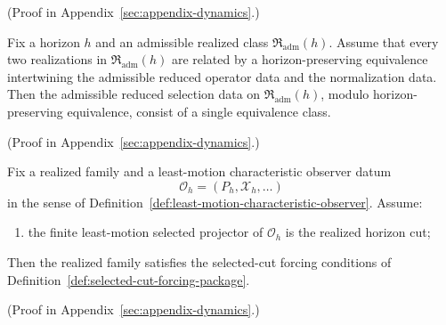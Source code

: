 (Proof in Appendix~\ref{sec:appendix-dynamics}.)

\begin{theorem}
\label{thm:classwise-horizon-equivalence-collapses-reduced-selection}
Fix a horizon \(h\) and an admissible realized class
\(\mathfrak R_{\mathrm{adm}}(h)\). Assume that every two realizations in
\(\mathfrak R_{\mathrm{adm}}(h)\) are related by a horizon-preserving
equivalence intertwining the admissible reduced operator data and the
normalization data. Then the admissible reduced selection data on
\(\mathfrak R_{\mathrm{adm}}(h)\), modulo horizon-preserving equivalence,
consist of a single equivalence class.
\end{theorem}

(Proof in Appendix~\ref{sec:appendix-dynamics}.)

\begin{theorem}
\label{thm:temporal-realization-forces-selected-cut-forcing-package}
Fix a realized family and a least-motion characteristic observer datum
\[
\mathcal O_h=(P_h,\mathcal X_h,\dots)
\]
in the sense of
Definition~\ref{def:least-motion-characteristic-observer}. Assume:
\begin{enumerate}[label=(\roman*), leftmargin=2em, itemsep=0.2em]
\item the finite least-motion selected projector of \(\mathcal O_h\) is the
      realized horizon cut;
\end{enumerate}
Then the realized family satisfies the selected-cut forcing conditions of
Definition~\ref{def:selected-cut-forcing-package}.
\end{theorem}

(Proof in Appendix~\ref{sec:appendix-dynamics}.)

